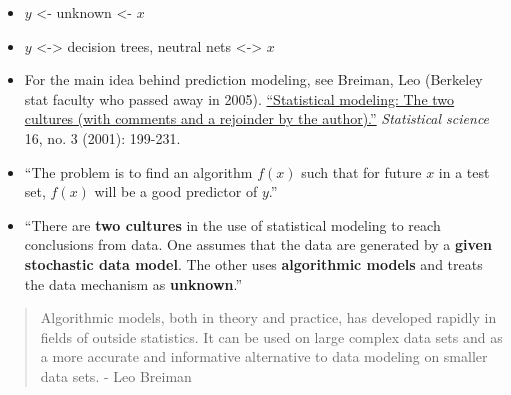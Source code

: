 \documentclass[
]{book}
\begin{document}
\begin{itemize}
  \begin{itemize}
  \item
    \(y\) \textless- unknown \textless- \(x\)
  \item
    \(y\) \textless-\textgreater{} decision trees, neutral nets \textless-\textgreater{} \(x\)
  \item
    For the main idea behind prediction modeling, see Breiman, Leo (Berkeley stat faculty who passed away in 2005). \href{https://projecteuclid.org/euclid.ss/1009213726}{``Statistical modeling: The two cultures (with comments and a rejoinder by the author).''} \emph{Statistical science} 16, no. 3 (2001): 199-231.
  \item
    ``The problem is to find an algorithm \(f(x)\) such that for future \(x\) in a test set, \(f(x)\) will be a good predictor of \(y\).''
  \item
    ``There are \textbf{two cultures} in the use of statistical modeling to reach conclusions from data. One assumes that the data are generated by a \textbf{given} \textbf{stochastic data model}. The other uses \textbf{algorithmic models} and treats the data mechanism as \textbf{unknown}.''
  \end{itemize}
\end{itemize}

\begin{quote}
Algorithmic models, both in theory and practice, has developed rapidly in fields of outside statistics. It can be used on large complex data sets and as a more accurate and informative alternative to data modeling on smaller data sets. - Leo Breiman
\end{quote}
\end{document}
